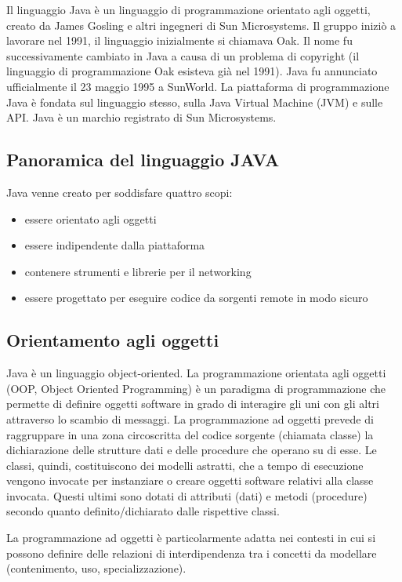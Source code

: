 Il  linguaggio Java  \`e  un  linguaggio  di  programmazione  orientato  agli  oggetti,  creato  da  James 
Gosling  e  altri  ingegneri  di  Sun  Microsystems.  Il  gruppo  inizi\`o  a  lavorare  nel  1991,  il  linguaggio 
inizialmente si chiamava Oak. Il nome fu successivamente cambiato in Java a causa di un problema di  copyright  (il  linguaggio  di  programmazione  Oak  esisteva  gi\`a nel  1991).  Java  fu  annunciato ufficialmente il 23 maggio 1995 a SunWorld. La piattaforma di programmazione Java \`e fondata sul 
linguaggio  stesso,  sulla  Java  Virtual Machine  (JVM) e  sulle  API.  Java  \`e  un  marchio  registrato  di Sun Microsystems.
\subsection{Panoramica del linguaggio JAVA}
Java venne creato per soddisfare quattro scopi: 
\begin{itemize}
\item essere orientato agli oggetti
\item essere indipendente dalla piattaforma
\item contenere strumenti e librerie per il networking
\item essere progettato per eseguire codice da sorgenti remote in modo sicuro
\end{itemize}
\subsection*{Orientamento agli oggetti}
Java \`e un linguaggio object-oriented. La programmazione orientata agli oggetti (OOP, Object Oriented Programming) \`e un paradigma di programmazione che permette di definire oggetti software in grado di interagire gli uni con gli altri attraverso lo scambio di messaggi.  
La programmazione ad oggetti prevede di raggruppare in una zona circoscritta del codice sorgente (chiamata classe) la dichiarazione delle strutture dati e delle procedure che operano su di esse. Le classi, quindi, costituiscono dei modelli astratti, che a tempo di esecuzione vengono invocate per instanziare o creare oggetti software relativi alla classe invocata. Questi ultimi sono dotati di attributi (dati) e metodi (procedure) secondo quanto definito/dichiarato dalle rispettive classi.

La programmazione ad oggetti \`e particolarmente adatta nei contesti in cui si possono definire delle relazioni di interdipendenza tra i concetti da modellare (contenimento, uso, specializzazione). 

